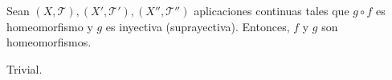 \begin{ejr}[30]
  Sean $( X, \mathcal{T} ), ( X', \mathcal{T}' ), ( X'', \mathcal{T}'' )$ aplicaciones continuas tales que $g \circ f$ es homeomorfismo y $g$ es inyectiva (suprayectiva). Entonces, $f$ y $g$ son homeomorfismos.
\end{ejr}

\begin{sol}
  Trivial.
\end{sol}
